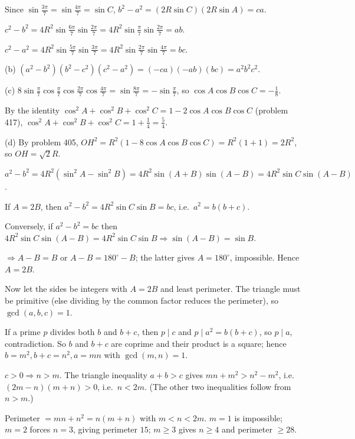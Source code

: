   Since $\sin\frac{3\pi}{7} = \sin\frac{4\pi}{7} = \sin C$, $b^2 - a^2 = (2R\sin C)(2R\sin A) = ca$.

  $c^2 - b^2 = 4R^2\sin\frac{6\pi}{7}\sin\frac{2\pi}{7} = 4R^2\sin\frac{\pi}{7}\sin\frac{2\pi}{7} = ab$.

  $c^2 - a^2 = 4R^2\sin\frac{5\pi}{7}\sin\frac{3\pi}{7} = 4R^2\sin\frac{2\pi}{7}\sin\frac{4\pi}{7} = bc$.

  (b) $(a^2 - b^2)(b^2 - c^2)(c^2 - a^2) = (-ca)(-ab)(bc) = a^2b^2c^2$.

  (c) $8\sin\frac{\pi}{7}\cos\frac{\pi}{7}\cos\frac{2\pi}{7}\cos\frac{4\pi}{7} = \sin\frac{8\pi}{7} =
  -\sin\frac{\pi}{7}$, so $\cos A\cos B\cos C = -\frac{1}{8}$.

  By the identity $\cos^2A + \cos^2B + \cos^2C = 1 - 2\cos A\cos B\cos C$ (problem 417), $\cos^2A + \cos^2B +
  \cos^2C = 1 + \frac{1}{4} = \frac{5}{4}$.

  (d) By problem 405, $OH^2 = R^2(1 - 8\cos A\cos B\cos C) = R^2(1 + 1) = 2R^2$, so $OH = \sqrt{2}R$.
\item $a^2 - b^2 = 4R^2(\sin^2A - \sin^2B) = 4R^2\sin(A + B)\sin(A - B) = 4R^2\sin C\sin(A - B)$.

  If $A = 2B$, then $a^2 - b^2 = 4R^2\sin C\sin B = bc$, i.e.\ $a^2 = b(b + c)$.

  Conversely, if $a^2 - b^2 = bc$ then $4R^2\sin C\sin(A - B) = 4R^2\sin C\sin B\Rightarrow \sin(A - B) = \sin
  B$.

  $\Rightarrow A - B = B$ or $A - B = 180^\circ - B$; the latter gives $A = 180^\circ$, impossible. Hence $A =
  2B$.

  Now let the sides be integers with $A = 2B$ and least perimeter. The triangle must be primitive (else
  dividing by the common factor reduces the perimeter), so $\gcd(a, b, c) = 1$.

  If a prime $p$ divides both $b$ and $b + c$, then $p\mid c$ and $p\mid a^2 = b(b + c)$, so $p\mid a$,
  contradiction. So $b$ and $b + c$ are coprime and their product is a square; hence $b = m^2, b + c = n^2, a
  = mn$ with $\gcd(m, n) = 1$.

  $c > 0\Rightarrow n > m$. The triangle inequality $a + b > c$ gives $mn + m^2 > n^2 - m^2$, i.e.\ $(2m -
  n)(m + n) > 0$, i.e.\ $n < 2m$. (The other two inequalities follow from $n > m$.)

  Perimeter $= mn + n^2 = n(m + n)$ with $m < n < 2m$. $m = 1$ is impossible; $m = 2$ forces $n = 3$, giving
  perimeter $15$; $m\geq 3$ gives $n\geq 4$ and perimeter $\geq 28$.

